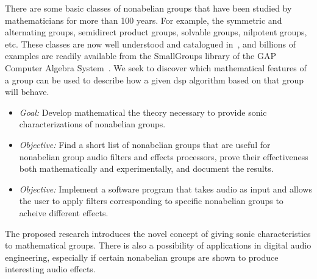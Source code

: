 \documentclass[10pt]{article}
\begin{document}
There are some basic classes of nonabelian groups that have been studied by
mathematicians for more than 100 years.  For example, the symmetric and 
alternating groups, semidirect product groups, solvable groups, nilpotent
groups, etc.  These classes are now well understood and catalogued
in~\cite{ATLAS:1986}, and billions of examples are readily available 
from the SmallGroups library of the GAP Computer Algebra System~\cite{GAP4}.   
We seek to discover which mathematical features of a group can be used to
describe how a given dsp algorithm based on that group will behave. 

\begin{itemize}
\item {\it Goal:}
Develop mathematical the theory necessary to provide sonic characterizations of nonabelian groups.
\item
{\it Objective:} Find a short list of nonabelian groups that are useful for
nonabelian group audio filters and effects processors, prove their effectiveness
both mathematically and experimentally, and document the results.
\item
{\it Objective:} Implement a software program that takes audio as input and
allows the user to apply filters corresponding to specific nonabelian groups to
acheive different effects. 
\end{itemize}

 
\vskip5mm

The proposed research introduces the novel concept of giving sonic
characteristics to mathematical groups.  There is also a possibility of
applications in digital audio engineering, especially if certain nonabelian
groups are shown to produce interesting audio effects. 
 
\end{document}
